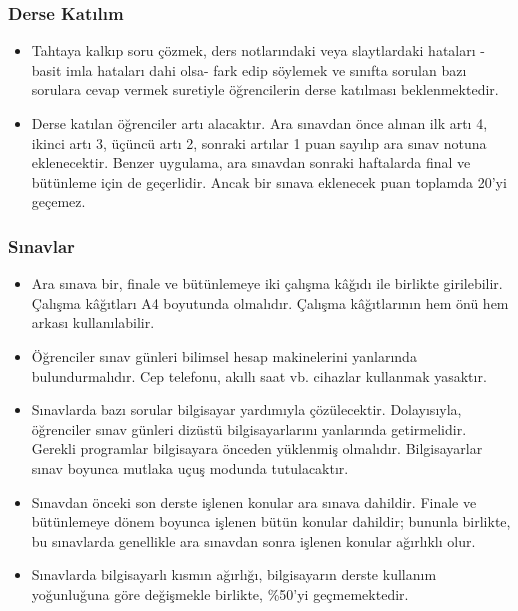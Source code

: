 \documentclass{article}
\begin{document}
\subsubsection*{Derse Katılım}

\begin{itemize}

\item Tahtaya kalkıp soru çözmek, ders notlarındaki veya slaytlardaki hataları -basit imla hataları dahi olsa- fark edip söylemek ve sınıfta sorulan bazı sorulara cevap vermek suretiyle öğrencilerin derse katılması beklenmektedir.

\item Derse katılan öğrenciler artı alacaktır. Ara sınavdan önce alınan ilk artı 4, ikinci artı 3, üçüncü artı 2, sonraki artılar 1 puan sayılıp ara sınav notuna eklenecektir. Benzer uygulama, ara sınavdan sonraki haftalarda final ve bütünleme için de geçerlidir. Ancak bir sınava eklenecek puan toplamda 20'yi geçemez.

\end{itemize}

\subsubsection*{Sınavlar}

\begin{itemize}

\item Ara sınava bir, finale ve bütünlemeye iki çalışma kâğıdı ile birlikte girilebilir. Çalışma kâğıtları A4 boyutunda olmalıdır. Çalışma kâğıtlarının hem önü hem arkası kullanılabilir.

\item Öğrenciler sınav günleri bilimsel hesap makinelerini yanlarında bulundurmalıdır. Cep telefonu, akıllı saat vb. cihazlar kullanmak yasaktır.

\item Sınavlarda bazı sorular bilgisayar yardımıyla çözülecektir. Dolayısıyla, öğrenciler sınav günleri dizüstü bilgisayarlarını yanlarında getirmelidir. Gerekli programlar bilgisayara önceden yüklenmiş olmalıdır. Bilgisayarlar sınav boyunca mutlaka uçuş modunda tutulacaktır.

\item Sınavdan önceki son derste işlenen konular ara sınava dahildir. Finale ve bütünlemeye dönem boyunca işlenen bütün konular dahildir; bununla birlikte, bu sınavlarda genellikle ara sınavdan sonra işlenen konular ağırlıklı olur.

\item Sınavlarda bilgisayarlı kısmın ağırlığı, bilgisayarın derste kullanım yoğunluğuna göre değişmekle birlikte, \%50'yi geçmemektedir.

\end{itemize}
\end{document}
